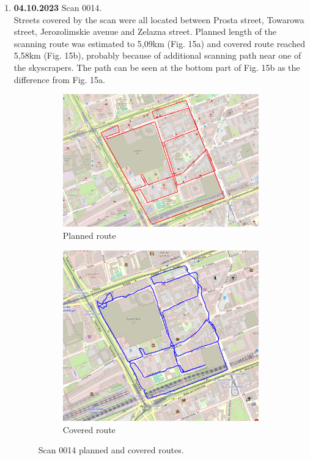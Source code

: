 \documentclass[a4paper,12pt]{article}
\begin{document}
\begin{enumerate}
	\item \textbf{04.10.2023} Scan 0014. \\
	Streets covered by the scan were all located between Prosta street, Towarowa street, Jerozolimskie avenue and Zelazna street. Planned length of the scanning route was estimated to 5,09km (Fig. 15a) and covered route reached 5,58km (Fig. 15b), probably because of additional scanning path near one of the skyscrapers. The path can be seen at the bottom part of Fig. 15b as the difference from Fig. 15a.
	\begin{figure}[H]
		\centering
		\begin{subfigure}{.90\textwidth}
			\centering
			\includegraphics[width=1\linewidth]{route_p14}
			\caption{Planned route}
			\label{fig:a14}
		\end{subfigure}%
		\linebreak
		\begin{subfigure}{.90\textwidth}
			\centering
			\includegraphics[width=1\linewidth]{route_c14}
			\caption{Covered route}
			\label{fig:b14}
		\end{subfigure}
		\caption{Scan 0014 planned and covered routes.}
		\label{fig:fig14}
	\end{figure} 
	\pagebreak
	

\end{enumerate}
\end{document}
